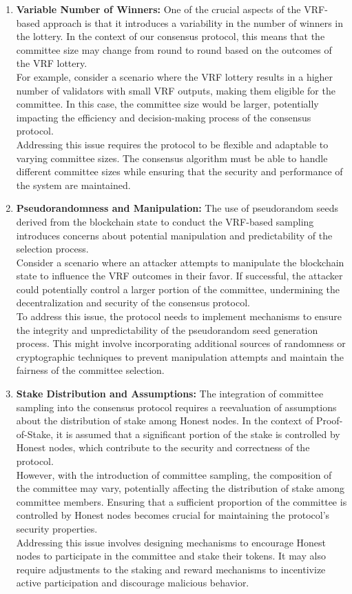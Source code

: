 \begin{enumerate}
    \item \textbf{Variable Number of Winners:} One of the crucial aspects of the VRF-based approach is that it introduces a variability in the number of winners in the lottery. In the context of our consensus protocol, this means that the committee size may change from round to round based on the outcomes of the VRF lottery.\\
    For example, consider a scenario where the VRF lottery results in a higher number of validators with small VRF outputs, making them eligible for the committee. In this case, the committee size would be larger, potentially impacting the efficiency and decision-making process of the consensus protocol.\\
    Addressing this issue requires the protocol to be flexible and adaptable to varying committee sizes. The consensus algorithm must be able to handle different committee sizes while ensuring that the security and performance of the system are maintained.
    
    \item \textbf{Pseudorandomness and Manipulation:} The use of pseudorandom seeds derived from the blockchain state to conduct the VRF-based sampling introduces concerns about potential manipulation and predictability of the selection process.\\
    Consider a scenario where an attacker attempts to manipulate the blockchain state to influence the VRF outcomes in their favor. If successful, the attacker could potentially control a larger portion of the committee, undermining the decentralization and security of the consensus protocol.\\
    To address this issue, the protocol needs to implement mechanisms to ensure the integrity and unpredictability of the pseudorandom seed generation process. This might involve incorporating additional sources of randomness or cryptographic techniques to prevent manipulation attempts and maintain the fairness of the committee selection.
    
    \item \textbf{Stake Distribution and Assumptions:} The integration of committee sampling into the consensus protocol requires a reevaluation of assumptions about the distribution of stake among Honest nodes. In the context of Proof-of-Stake, it is assumed that a significant portion of the stake is controlled by Honest nodes, which contribute to the security and correctness of the protocol.\\
    However, with the introduction of committee sampling, the composition of the committee may vary, potentially affecting the distribution of stake among committee members. Ensuring that a sufficient proportion of the committee is controlled by Honest nodes becomes crucial for maintaining the protocol's security properties.\\
    Addressing this issue involves designing mechanisms to encourage Honest nodes to participate in the committee and stake their tokens. It may also require adjustments to the staking and reward mechanisms to incentivize active participation and discourage malicious behavior.
\end{enumerate}
